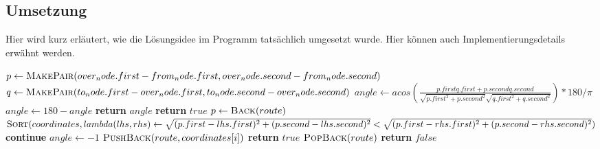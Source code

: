 \documentclass[a4paper,10pt,ngerman]{scrartcl}
\begin{document}
\begin{algorithm}[H]
        \newpage


        \section{Umsetzung}\label{sec:umsetzung}
        Hier wird kurz erläutert, wie die Lösungsidee im Programm tatsächlich umgesetzt wurde.
        Hier können auch Implementierungsdetails erwähnt werden.

        \begin{algorithm}
            \begin{algorithmic}[1]
                    \State $p \gets \Call{MakePair}{over_node.first-from_node.first,over_node.second-from_node.second}$
                    \State $q \gets \Call{MakePair}{to_node.first-over_node.first,to_node.second-over_node.second}$
                    \State $angle \gets acos(\frac{p.firstq.first+p.secondq.second}{\sqrt{p.first^2+p.second^2}\sqrt{q.first^2+q.second^2}})*180/\pi$
                        \State $angle \gets 180-angle$
                    \EndIf
                    \State \textbf{return} $angle$
                \EndFunction
                \State
                        \State \textbf{return} $true$
                    \EndIf
                        \State $p \gets \Call{Back}{route}$
                        \State $\Call{Sort}{coordinates,lambda (lhs,rhs) \gets \sqrt{(p.first-lhs.first)^2+(p.second-lhs.second)^2}<\sqrt{(p.first-rhs.first)^2+(p.second-rhs.second)^2}}$
                    \EndIf
                            \State \textbf{continue}
                        \EndIf
                        \State $angle \gets -1$
                        \EndIf
                            \State $\Call{PushBack}{route,coordinates[i]}$
                                \State \textbf{return} $true$
                            \Else
                                \State $\Call{PopBack}{route}$
                            \EndIf
                        \EndIf
                    \EndFor
                    \State \textbf{return} $false$
                \EndFunction
            \end{algorithmic}\label{alg:algorithm}
        \end{algorithm}


\end{algorithm}
\end{document}
